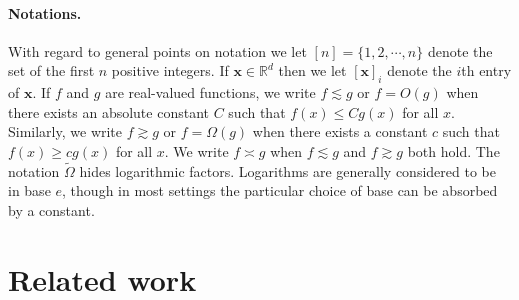 \documentclass{article}
\theoremstyle{definition}
\newcommand*{\R}{\mathbb{R}}
\def\vx{{\bm{x}}}
\begin{document}
\paragraph{Notations.} 
With regard to general points on notation we let $[n] = \{1, 2, \cdots, n\}$ denote the set of the first $n$ positive integers. If $\vx \in \R^d$ then we let $[\vx]_i$ denote the $i$th entry of $\vx$. If $f$ and $g$ are real-valued functions, we write $f \lesssim g$ or $f = O(g)$ when there exists an absolute constant $C$ such that $f(x) \leq C g(x)$ for all $x$. Similarly, we write $f \gtrsim g$ or $f = \Omega(g)$ when there exists a constant $c$ such that $f(x) \geq c g(x)$ for all $x$. We write $f \asymp g$ when $f \lesssim g$ and $f \gtrsim g$ both hold. The notation $\tilde\Omega$ hides logarithmic factors. Logarithms are generally considered to be in base $e$, though in most settings the particular choice of base can be absorbed by a constant. 










\section{Related work} 
\label{sec:related-work} 
\end{document}
